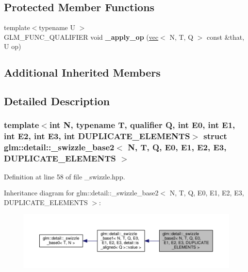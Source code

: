 \subsection*{Protected Member Functions}
\begin{DoxyCompactItemize}
\item 
\mbox{\label{structglm_1_1detail_1_1__swizzle__base2_a1b95928a524631e5bc6976ee1c7a6dd9}} 
{\footnotesize template$<$typename U $>$ }\\G\+L\+M\+\_\+\+F\+U\+N\+C\+\_\+\+Q\+U\+A\+L\+I\+F\+I\+ER void {\bfseries \+\_\+apply\+\_\+op} (\hyperlink{structglm_1_1vec}{vec}$<$ N, T, Q $>$ const \&that, U op)
\end{DoxyCompactItemize}
\subsection*{Additional Inherited Members}


\subsection{Detailed Description}
\subsubsection*{template$<$int N, typename T, qualifier Q, int E0, int E1, int E2, int E3, int D\+U\+P\+L\+I\+C\+A\+T\+E\+\_\+\+E\+L\+E\+M\+E\+N\+TS$>$\newline
struct glm\+::detail\+::\+\_\+swizzle\+\_\+base2$<$ N, T, Q, E0, E1, E2, E3, D\+U\+P\+L\+I\+C\+A\+T\+E\+\_\+\+E\+L\+E\+M\+E\+N\+T\+S $>$}



Definition at line 58 of file \+\_\+swizzle.\+hpp.



Inheritance diagram for glm\+:\+:detail\+:\+:\+\_\+swizzle\+\_\+base2$<$ N, T, Q, E0, E1, E2, E3, D\+U\+P\+L\+I\+C\+A\+T\+E\+\_\+\+E\+L\+E\+M\+E\+N\+TS $>$\+:
\nopagebreak
\begin{figure}[H]
\begin{center}
\leavevmode
\includegraphics[width=350pt]{d0/d26/structglm_1_1detail_1_1__swizzle__base2__inherit__graph}
\end{center}
\end{figure}



